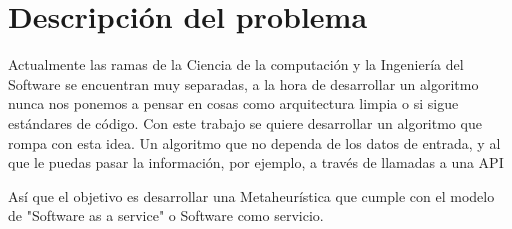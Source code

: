 \chapter{Descripción del problema}

    Actualmente las ramas de la Ciencia de la computación y la Ingeniería del Software se encuentran muy separadas, a la
hora de desarrollar un algoritmo nunca nos ponemos a pensar en cosas como arquitectura limpia o si sigue estándares
de código. Con este trabajo se quiere desarrollar un algoritmo que rompa con esta idea. Un algoritmo que no dependa
de los datos de entrada, y al que le puedas pasar la información, por ejemplo, a través de llamadas a una API

    Así que el objetivo es desarrollar una Metaheurística que cumple con el modelo de "Software as a service" o Software
como servicio.


